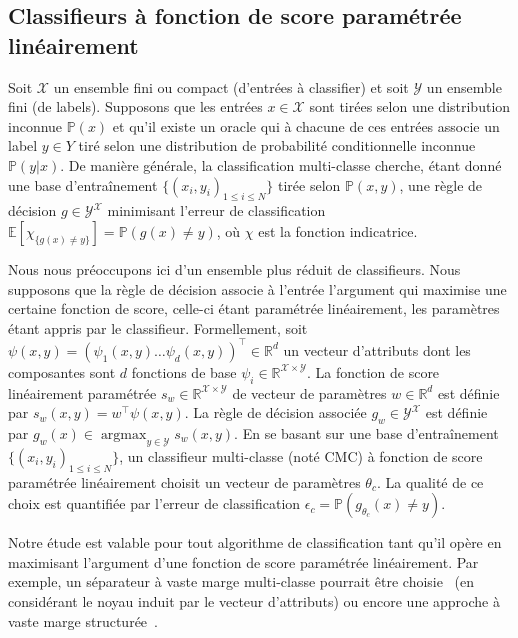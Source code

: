 \documentclass[french,utf8]{./hermes-journal}
\newcommand{\argmax}{\operatorname*{argmax}} %
\newcommand{\X}{\mathcal{X}}
\newcommand{\Y}{\mathcal{Y}}
\newcommand{\E}{\mathbb{E}}
\newcommand{\prob}{\mathbb{P}}
\begin{document}
\subsection{Classifieurs à fonction de score paramétrée linéairement} \label{subseackgrounlassif}

Soit $\X$ un ensemble fini ou compact (d'entrées à classifier)
 et soit $\Y$ un ensemble fini (de labels). Supposons que les entrées $x\in
\X$ sont tirées selon une distribution inconnue $\prob(x)$ et qu'il existe un oracle qui à chacune de ces entrées associe un label $y\in Y$ tiré selon une distribution de probabilité conditionnelle inconnue $\prob(y|x)$. De manière générale, la classification multi-classe cherche, étant donné une base d'entraînement $\{(x_i,y_i)_{1\leq i \leq N}\}$ tirée selon $\prob(x,y)$, une règle de décision $g\in\Y^\X$ minimisant l'erreur de classification $\E[\chi_{\{g(x)\neq y\}}] = \prob(g(x)\neq y)$, où $\chi$ est la fonction indicatrice.

Nous nous préoccupons ici d'un ensemble plus réduit de classifieurs. Nous supposons que la règle de décision associe à l'entrée l'argument qui maximise une certaine fonction de score, celle-ci étant paramétrée linéairement, les paramètres étant appris par le classifieur. Formellement, soit $\psi(x,y) =
(\psi_1(x,y)  \dots  \psi_d(x,y))^\top\in \mathbb{R}^d$
un vecteur d'attributs dont les composantes sont $d$ fonctions de base $\psi_i\in\mathbb{R}^{\X\times\Y}$. La fonction de score linéairement paramétrée $s_w\in\mathbb{R}^{\X\times \Y}$ de vecteur de paramètres $w\in\mathbb{R}^d$ est définie par $s_w(x,y) = w^\top \psi(x,y)$. La règle de décision associée $g_w\in{\Y^\X}$ est définie par $g_w(x) \in \argmax_{y\in\Y}s_w(x,y)$. En se basant sur une base d'entraînement $\{(x_i,y_i)_{1\leq
i\leq N}\}$, un classifieur multi-classe (noté CMC) à fonction de score paramétrée linéairement choisit un vecteur de paramètres $\theta_c$. La qualité de ce choix est quantifiée par l'erreur de classification $\epsilon_c =
\prob(g_{\theta_c}(x)\neq y)$. %

Notre étude est valable pour tout algorithme de classification tant qu'il opère en maximisant l'argument d'une fonction de score paramétrée linéairement. Par exemple, un séparateur à vaste marge multi-classe pourrait être choisie~\cite{Guermeu007} (en considérant le noyau induit par le vecteur d'attributs) ou encore une approche à vaste marge structurée~\cite{Taska005}. 
\end{document}
